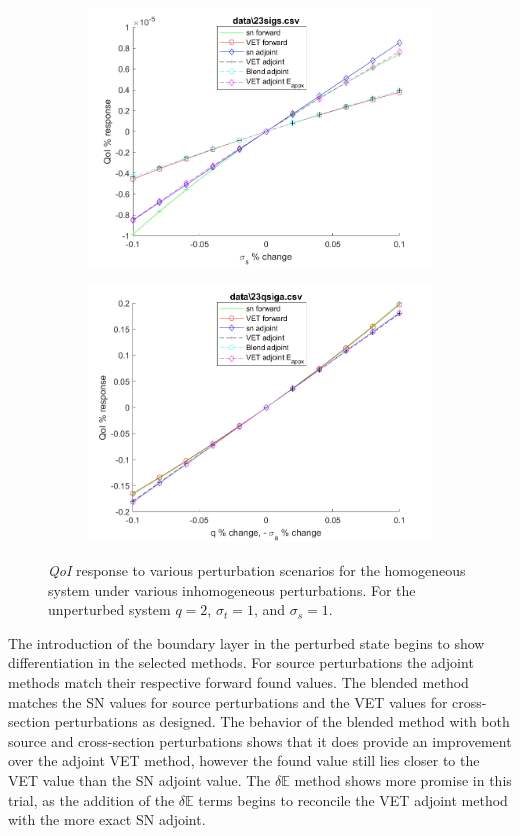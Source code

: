 \documentclass[12pt]{report}
\newcommand{\Edd}{\mathbb{E}}
\newcommand{\sigt}{\sigma_t}
\newcommand{\sigs}{\sigma_s}
\newcommand{\qoi}{{\it QoI}\xspace}
\begin{document}
\begin{figure}[H]
\begin{subfigure}{.5\textwidth}
  \includegraphics[width=.98\linewidth]{figures2/23sigsSens.png}
  \label{T2:sfig3}
\end{subfigure}%
\begin{subfigure}{.5\textwidth}
  \centering
  \includegraphics[width=.98\linewidth]{figures2/23qsigaSens.png}
  \label{T2:sfig4}
\end{subfigure}
\caption{\qoi response to various perturbation scenarios for the homogeneous system under various inhomogeneous perturbations. For the unperturbed system $q=2$, $\sigt=1$, and $\sigs=1$.}
\end{figure}

The introduction of the boundary layer in the perturbed state begins to show differentiation in the selected methods. For source perturbations the adjoint methods match their respective forward found values. The blended method matches the SN values for source perturbations and the VET values for cross-section perturbations as designed. The behavior of the blended method with both source and cross-section perturbations shows that it does provide an improvement over the adjoint VET method, however the found value still lies closer to the VET value than the SN adjoint value. The $\delta \Edd$ method shows more promise in this trial, as the addition of the $\delta \Edd$ terms begins to reconcile the VET adjoint method with the more exact SN adjoint. 
\end{document}
